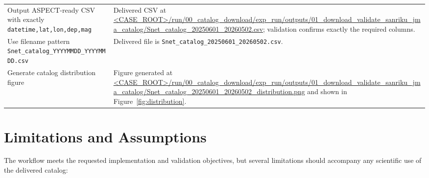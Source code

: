 \documentclass[11pt]{article}
\newcommand{\catalogcsvurl}{\url{<CASE_ROOT>/run/00_catalog_download/exp_run/outputs/01_download_validate_sanriku_jma_catalog/Snet_catalog_20250601_20260502.csv}}
\newcommand{\distributionfigurl}{\url{<CASE_ROOT>/run/00_catalog_download/exp_run/outputs/01_download_validate_sanriku_jma_catalog/Snet_catalog_20250601_20260502_distribution.png}}
\begin{document}
\begin{longtable}{>{\raggedright\arraybackslash}p{}>{\raggedright\arraybackslash}p{}}
Output ASPECT-ready CSV with exactly \texttt{datetime,lat,lon,dep,mag} & Delivered CSV at \catalogcsvurl; validation confirms exactly the required columns. \\
Use filename pattern \texttt{Snet\_catalog\_YYYYMMDD\_YYYYMMDD.csv} & Delivered file is \texttt{Snet\_catalog\_20250601\_20260502.csv}. \\
Generate catalog distribution figure & Figure generated at \distributionfigurl{} and shown in Figure~\ref{fig:distribution}. \\
\bottomrule
\end{longtable}

\section{Limitations and Assumptions}

The workflow meets the requested implementation and validation objectives, but several limitations should accompany any scientific use of the delivered catalog:
\end{document}
